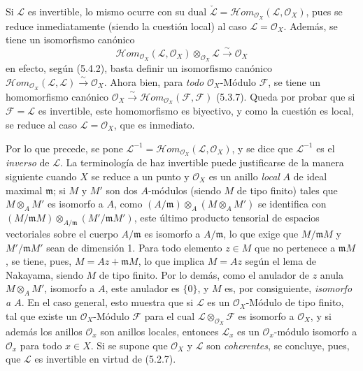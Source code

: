 \begin{env}[5.4.3]
Si $\mathcal{L}$ es invertible, lo mismo ocurre con su dual
$\check{\mathcal{L}}=
\mathcal{H}\!om_{\mathcal{O}_X}(\mathcal{L},\mathcal{O}_X)$, pues se reduce
inmediatamente (siendo la cuestión local) al caso $\mathcal{L}=\mathcal{O}_X$. Además,
se tiene un isomorfismo canónico
\[
  \mathcal{H}\!om_{\mathcal{O}_X}(\mathcal{L},\mathcal{O}_X)
  \otimes_{\mathcal{O}_X}\mathcal{L}
  \xrightarrow{\sim}
  \mathcal{O}_X
  \tag{5.4.3.1}\label{0.5.4.3.1-fr}
\]
en efecto, según (5.4.2), basta definir un isomorfismo canónico
$\mathcal{H}\!om_{\mathcal{O}_X}(\mathcal{L},\mathcal{L})
\xrightarrow{\sim}\mathcal{O}_X$. Ahora bien, para \emph{todo}
$\mathcal{O}_X$-Módulo $\mathcal{F}$, se tiene un homomorfismo canónico
$\mathcal{O}_X\xrightarrow{\sim}
\mathcal{H}\!om_{\mathcal{O}_X}(\mathcal{F},\mathcal{F})$ (5.3.7). Queda
por probar que si $\mathcal{F}=\mathcal{L}$ es invertible, este homomorfismo
es biyectivo, y como la cuestión es local, se reduce al caso
$\mathcal{L}=\mathcal{O}_X$, que es inmediato.

Por lo que precede, se pone
$\mathcal{L}^{-1}=
\mathcal{H}\!om_{\mathcal{O}_X}(\mathcal{L},\mathcal{O}_X)$, y se dice que
$\mathcal{L}^{-1}$ es el \emph{inverso} de $\mathcal{L}$. La terminología de
\og haz invertible\fg{} puede justificarse de la manera siguiente cuando $X$ se
reduce a un punto y $\mathcal{O}_X$ es un anillo \emph{local} $A$ de ideal
maximal $\mathfrak m$; si $M$ y $M'$ son dos $A$-módulos (siendo $M$ de
tipo finito) tales que $M\otimes_A M'$ es isomorfo a $A$, como
$(A/\mathfrak m)\otimes_A(M\otimes_A M')$ se identifica con
$(M/\mathfrak mM)\otimes_{A/\mathfrak m}(M'/\mathfrak mM')$, este último
producto tensorial de espacios vectoriales sobre el cuerpo $A/\mathfrak m$ es
isomorfo a $A/\mathfrak m$, lo que exige que $M/\mathfrak mM$ y
$M'/\mathfrak mM'$ sean de dimensión 1. Para todo elemento $z\in M$
que no pertenece a $\mathfrak mM$, se tiene, pues, $M=Az+\mathfrak mM$, lo que
implica $M=Az$ según el lema de Nakayama, siendo $M$ de tipo finito.
Por lo demás, como el anulador de $z$ anula $M\otimes_A M'$, isomorfo a
$A$, este anulador es $\{0\}$, y $M$ es, por consiguiente, \emph{isomorfo a $A$}.
En el caso general, esto muestra que si $\mathcal{L}$ es un
$\mathcal{O}_X$-Módulo de tipo finito, tal que existe un
$\mathcal{O}_X$-Módulo $\mathcal{F}$ para el cual
$\mathcal{L}\otimes_{\mathcal{O}_X}\mathcal{F}$ es isomorfo a
$\mathcal{O}_X$, y si además los anillos $\mathcal{O}_x$ son anillos
locales, entonces $\mathcal{L}_x$ es un $\mathcal{O}_x$-módulo isomorfo a
$\mathcal{O}_x$ para todo $x\in X$. Si se supone que $\mathcal{O}_X$ y $\mathcal{L}$ son
\emph{coherentes}, se concluye, pues, que $\mathcal{L}$ es invertible
en virtud de (5.2.7).
\end{env}

